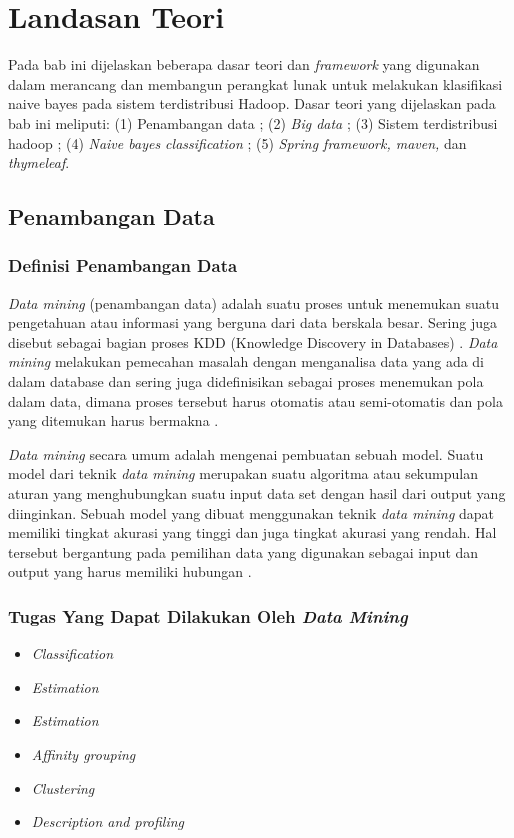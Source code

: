 \chapter{Landasan Teori}

Pada bab ini dijelaskan beberapa dasar teori dan \textit{framework} yang digunakan dalam merancang dan membangun perangkat lunak untuk melakukan klasifikasi naive bayes pada sistem terdistribusi Hadoop. Dasar teori yang dijelaskan pada bab ini meliputi: (1) Penambangan data ; (2) \textit{Big data} ; (3) Sistem terdistribusi hadoop ; (4) \textit{Naive bayes classification} ; (5) \textit{Spring framework, maven, } dan \textit{thymeleaf}. \\

\section{Penambangan Data}

\subsection{Definisi Penambangan Data}
\textit{Data mining} (penambangan data) adalah suatu proses untuk menemukan suatu
pengetahuan atau informasi yang berguna dari data berskala besar. Sering juga
disebut sebagai bagian proses KDD (Knowledge Discovery in Databases) \cite{Piateski:1991:KDD:583310}. \textit{Data mining} melakukan pemecahan masalah dengan menganalisa data yang ada di dalam database dan sering juga didefinisikan sebagai proses menemukan pola dalam data, dimana proses tersebut harus otomatis atau semi-otomatis dan pola yang ditemukan harus bermakna \cite{DataMiningIntro:2015}.

\textit{Data mining} secara umum adalah mengenai pembuatan sebuah model. Suatu model dari teknik \textit{data mining} merupakan suatu algoritma atau sekumpulan aturan yang menghubungkan suatu input data set dengan hasil dari output yang diinginkan. Sebuah model yang dibuat menggunakan teknik \textit{data mining} dapat memiliki tingkat akurasi yang tinggi dan juga tingkat akurasi yang rendah. Hal tersebut bergantung pada pemilihan data yang digunakan sebagai input dan output yang harus memiliki hubungan \cite{book:339389}.

\subsection{Tugas Yang Dapat Dilakukan Oleh \textit{Data Mining}}
\begin{itemize}
	\item \textit{Classification}
	\item \textit{Estimation}
	\item \textit{Estimation}
	\item \textit{Affinity grouping}
	\item \textit{Clustering}
	\item \textit{Description and profiling}
\end{itemize}

